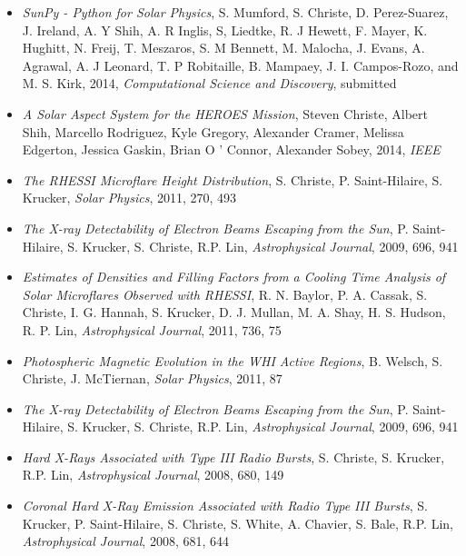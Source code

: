 \begin{itemize}
\item {\it SunPy - Python for Solar Physics},  S. Mumford, S. Christe, D. Perez-Suarez, J. Ireland, A. Y Shih, A. R Inglis, S, Liedtke, R. J Hewett, F. Mayer, K. Hughitt, N. Freij, T. Meszaros, S. M Bennett, M. Malocha, J. Evans, A. Agrawal, A. J Leonard, T. P Robitaille, B. Mampaey, J. I. Campos-Rozo, and M. S. Kirk, 2014, {\it Computational Science and Discovery}, submitted

\item {\it A Solar Aspect System for the HEROES Mission}, Steven Christe, Albert Shih, Marcello Rodriguez, Kyle Gregory, Alexander Cramer, Melissa Edgerton, Jessica Gaskin, Brian O ' Connor, Alexander Sobey, 2014, {\it IEEE}

\item {\it The RHESSI Microflare Height Distribution}, S. Christe, P. Saint-Hilaire, S. Krucker, {\it Solar Physics}, 2011, 270, 493

\item {\it The X-ray Detectability of Electron Beams Escaping from the Sun}, P. Saint-Hilaire, S. Krucker, S. Christe, R.P. Lin, {\it Astrophysical Journal}, 2009, 696, 941

\item {\it Estimates of Densities and Filling Factors from a Cooling Time Analysis of Solar Microflares Observed with RHESSI}, R. N. Baylor, P. A. Cassak, S. Christe, I. G. Hannah, S. Krucker, D. J. Mullan, M. A. Shay, H. S. Hudson, R. P. Lin, {\it Astrophysical Journal}, 2011, 736, 75

\item {\it Photospheric Magnetic Evolution in the WHI Active Regions}, B. Welsch, S. Christe, J. McTiernan, {\it Solar Physics}, 2011, 87

\item {\it The X-ray Detectability of Electron Beams Escaping from the Sun}, P. Saint-Hilaire, S. Krucker, S. Christe, R.P. Lin, {\it Astrophysical Journal}, 2009, 696, 941

\item {\it Hard X-Rays Associated with Type III Radio Bursts}, S. Christe, S. Krucker, R.P. Lin, {\it Astrophysical Journal}, 2008, 680, 149

\item {\it Coronal Hard X-Ray Emission Associated with Radio Type III Bursts}, S. Krucker, P. Saint-Hilaire, S. Christe, S. White, A. Chavier, S. Bale, R.P. Lin, {\it Astrophysical Journal}, 2008, 681, 644


\end{itemize}
